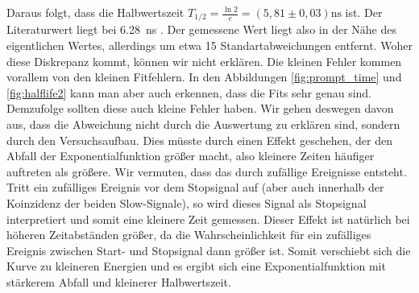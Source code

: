 Daraus folgt, dass die Halbwertszeit $T_{1/2} = \frac{\ln{2}}{c} = (5,81 \pm 0,03) \si{\nano\second}$ ist. Der Literaturwert liegt bei \SI{6,28}{\nano\second} \cite{cs133}. Der gemessene Wert liegt also in der Nähe des eigentlichen Wertes, allerdings um etwa 15 Standartabweichungen entfernt. Woher diese Diskrepanz kommt, können wir nicht erklären. Die kleinen Fehler kommen vorallem von den kleinen Fitfehlern. In den Abbildungen \ref{fig:prompt_time} und \ref{fig:halflife2} kann man aber auch erkennen, dass die Fits sehr genau sind. Demzufolge sollten diese auch kleine Fehler haben. Wir gehen deswegen davon aus, dass die Abweichung nicht durch die Auswertung zu erklären sind, sondern durch den Versuchsaufbau. Dies müsste durch einen Effekt geschehen, der den Abfall der Exponentialfunktion größer macht, also kleinere Zeiten häufiger auftreten als größere. Wir vermuten, dass das durch zufällige Ereignisse entsteht. Tritt ein zufälliges Ereignis vor dem Stopsignal auf (aber auch innerhalb der Koinzidenz der beiden Slow-Signale), so wird dieses Signal als Stopsignal interpretiert und somit eine kleinere Zeit gemessen. Dieser Effekt ist natürlich bei höheren Zeitabständen größer, da die Wahrscheinlichkeit für ein zufälliges Ereignis zwischen Start- und Stopsignal dann größer ist. Somit verschiebt sich die Kurve zu kleineren Energien und es ergibt sich eine Exponentialfunktion mit stärkerem Abfall und kleinerer Halbwertszeit. 